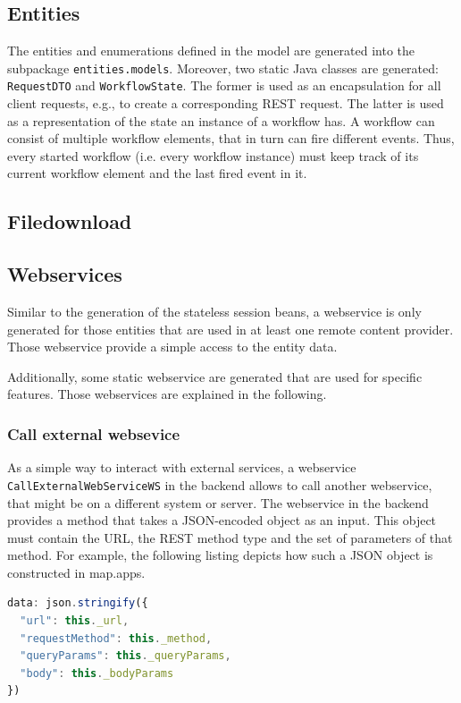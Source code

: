 \subsection{Entities}
The entities and enumerations defined in the \MD model are generated into the subpackage \lstinline|entities.models|. Moreover, two static Java classes are generated:  \lstinline|RequestDTO| and \lstinline|WorkflowState|. The former is used as an encapsulation for all client requests, e.g., to create a corresponding REST request. The latter is used as a representation of the state an instance of a workflow has. A workflow can consist of multiple workflow elements, that in turn can fire different events. Thus, every started workflow (i.e. every workflow instance) must keep track of its current workflow element and the last fired event in it.

\subsection{Filedownload}

\subsection{Webservices}
Similar to the generation of the stateless session beans, a webservice is only generated for those entities that are used in at least one remote content provider. Those webservice provide a simple access to the entity data.

Additionally, some static webservice are generated that are used for specific features. Those webservices are explained in the following.
\subsubsection{Call external websevice}
As a simple way to interact with external services, a webservice \lstinline|CallExternalWebServiceWS| in the backend allows to call another webservice, that might be on a different system or server. The webservice in the backend provides a method that takes a JSON-encoded object as an input. This object must contain the URL, the REST method type and the set of parameters of that method. For example, the following listing depicts how such a JSON object is constructed in map.apps.

\begin{lstlisting}[language=Javascript, label=lst:callExtWSJSON, caption=JSON-encoded object containing information to call an external webservice]
data: json.stringify({
  "url": this._url,
  "requestMethod": this._method,
  "queryParams": this._queryParams,
  "body": this._bodyParams
})
\end{lstlisting}

